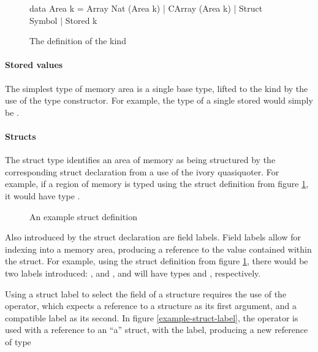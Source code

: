 \begin{figure}[h]
\begin{code}
data Area k = Array Nat (Area k)
            | CArray (Area k)
            | Struct Symbol
            | Stored k
\end{code}
\caption{The definition of the  kind}
\end{figure}

\paragraph{Stored values}
The simplest type of memory area is a single base type, lifted to the 
kind by the use of the  type constructor.  For example, the type of
a single stored  would simply be .

\paragraph{Structs}
The struct type identifies an area of memory as being structured by the
corresponding struct declaration from a use of the ivory quasiquoter.  For
example, if a region of memory is typed using the struct definition from figure
\ref{example-struct}, it would have type .

\begin{figure}[h]
\begin{code}
\end{code}
\caption{An example struct definition}
\label{example-struct}
\end{figure}

Also introduced by the struct declaration are field labels.  Field labels allow
for indexing into a memory area, producing a reference to the value contained
within the struct.  For example, using the struct definition from figure
\ref{example-struct}, there would be two labels introduced: , and
, and will have types  and , respectively.

Using a struct label to select the field of a structure requires the use of the
\cd{(\mytilde>)} operator, which expects a reference to a structure as its first
argument, and a compatible label as its second.  In figure
\ref{example-struct-label}, the \cd{(\mytilde>)} operator is used with a reference to
an ``a'' struct, with the  label, producing a new reference of type


